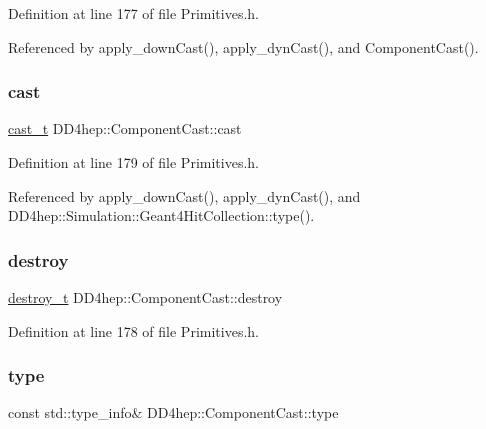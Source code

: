 Definition at line 177 of file Primitives.\+h.



Referenced by apply\+\_\+down\+Cast(), apply\+\_\+dyn\+Cast(), and Component\+Cast().

\hypertarget{class_d_d4hep_1_1_component_cast_a2f6cd06755e613e3f02c5302361d7024}{}\label{class_d_d4hep_1_1_component_cast_a2f6cd06755e613e3f02c5302361d7024} 
\subsubsection{\texorpdfstring{cast}{cast}}
{\footnotesize\ttfamily \hyperlink{class_d_d4hep_1_1_component_cast_af22751cad5f2f61dbae30c26c91ac621}{cast\+\_\+t} D\+D4hep\+::\+Component\+Cast\+::cast}



Definition at line 179 of file Primitives.\+h.



Referenced by apply\+\_\+down\+Cast(), apply\+\_\+dyn\+Cast(), and D\+D4hep\+::\+Simulation\+::\+Geant4\+Hit\+Collection\+::type().

\hypertarget{class_d_d4hep_1_1_component_cast_af161de076d882540309e24d86ef50137}{}\label{class_d_d4hep_1_1_component_cast_af161de076d882540309e24d86ef50137} 
\subsubsection{\texorpdfstring{destroy}{destroy}}
{\footnotesize\ttfamily \hyperlink{class_d_d4hep_1_1_component_cast_a846aa2764437b52901326d56a1092c59}{destroy\+\_\+t} D\+D4hep\+::\+Component\+Cast\+::destroy}



Definition at line 178 of file Primitives.\+h.

\hypertarget{class_d_d4hep_1_1_component_cast_a984d18ed863fe54855cf3308560270f0}{}\label{class_d_d4hep_1_1_component_cast_a984d18ed863fe54855cf3308560270f0} 
\subsubsection{\texorpdfstring{type}{type}}
{\footnotesize\ttfamily const std\+::type\+\_\+info\& D\+D4hep\+::\+Component\+Cast\+::type}



